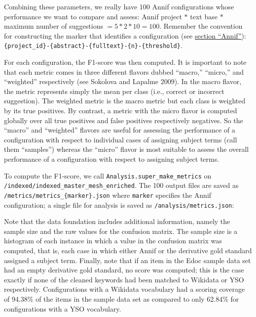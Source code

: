 Combining these parameters, we really have 100 Annif configurations
whose performance we want to compare and assess: Annif project \(*\)
text base \(*\) maximum number of suggestions \(= 5 * 2 * 10 = 100\).
Remember the convention for constructing the marker that identifies a
configuration (see \protect\hyperlink{annif}{section ``Annif''}):
\texttt{\{project\_id\}-\{abstract\}-\{fulltext\}-\{n\}-\{threshold\}}.

For each configuration, the F1-score was then computed. It is important
to note that each metric comes in three different flavors dubbed
``macro,'' ``micro,'' and ``weighted'' respectively (see Sokolova and
Lapalme 2009). In the macro flavor, the metric represents simply the
mean per class (i.e., correct or incorrect suggestion). The weighted
metric is the macro metric but each class is weighted by its true
positives. By contrast, a metric with the micro flavor is computed
globally over all true positives and false positives respectively
negatives. So the ``macro'' and ``weighted'' flavors are useful for
assessing the performance of a configuration with respect to individual
cases of assigning subject terms (call them ``samples'') whereas the
``micro'' flavor is most suitable to assess the overall performance of a
configuration with respect to assigning subject terms.

To compute the F1-score, we call \texttt{Analysis.super\_make\_metrics}
on \texttt{/indexed/indexed\_master\_mesh\_enriched}. The 100 output
files are saved as \texttt{/metrics/metrics\_\{marker\}.json} where
\texttt{marker} specifies the Annif configuration; a single file for
analysis is saved as \texttt{/analysis/metrics.json}:

\begin{Shaded}
\begin{Highlighting}[]
\OperatorTok{+} \NormalTok{)}
\end{Highlighting}
\end{Shaded}

Note that the data foundation includes additional information, namely
the sample size and the raw values for the confusion matrix. The sample
size is a histogram of each instance in which a value in the confusion
matrix was computed, that is, each case in which either Annif or the
derivative gold standard assigned a subject term. Finally, note that if
an item in the Edoc sample data set had an empty derivative gold
standard, no score was computed; this is the case exactly if none of the
cleaned keywords had been matched to Wikidata or YSO respectively.
Configurations with a Wikidata vocabulary had a scoring coverage of
94.38\% of the items in the sample data set as compared to only 62.84\%
for configurations with a YSO vocabulary.

